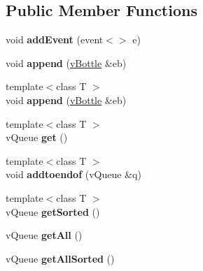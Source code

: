 \subsection*{Public Member Functions}
\begin{DoxyCompactItemize}
\item 
void {\bfseries add\+Event} (event$<$$>$ e)\hypertarget{classev_1_1vBottle_a5b17f0b46d9260ab255f38382b4b7268}{}\label{classev_1_1vBottle_a5b17f0b46d9260ab255f38382b4b7268}

\item 
void {\bfseries append} (\hyperlink{classev_1_1vBottle}{v\+Bottle} \&eb)\hypertarget{classev_1_1vBottle_a0c78e6f9ef839038d71486f6a8a6294a}{}\label{classev_1_1vBottle_a0c78e6f9ef839038d71486f6a8a6294a}

\item 
{\footnotesize template$<$class T $>$ }\\void {\bfseries append} (\hyperlink{classev_1_1vBottle}{v\+Bottle} \&eb)\hypertarget{classev_1_1vBottle_a9ef66f613e1bbf196c515e7d8b0416df}{}\label{classev_1_1vBottle_a9ef66f613e1bbf196c515e7d8b0416df}

\item 
{\footnotesize template$<$class T $>$ }\\v\+Queue {\bfseries get} ()\hypertarget{classev_1_1vBottle_a86302277c279a1b02d92f8e12afe6a2c}{}\label{classev_1_1vBottle_a86302277c279a1b02d92f8e12afe6a2c}

\item 
{\footnotesize template$<$class T $>$ }\\void {\bfseries addtoendof} (v\+Queue \&q)\hypertarget{classev_1_1vBottle_a65bf90aec03b80dee45bf834efe3fbfc}{}\label{classev_1_1vBottle_a65bf90aec03b80dee45bf834efe3fbfc}

\item 
{\footnotesize template$<$class T $>$ }\\v\+Queue {\bfseries get\+Sorted} ()\hypertarget{classev_1_1vBottle_a27569b9aaa7eb1ff9135d435b841c2de}{}\label{classev_1_1vBottle_a27569b9aaa7eb1ff9135d435b841c2de}

\item 
v\+Queue {\bfseries get\+All} ()\hypertarget{classev_1_1vBottle_af2abadf41f73c455dd451e34e9ba3376}{}\label{classev_1_1vBottle_af2abadf41f73c455dd451e34e9ba3376}

\item 
v\+Queue {\bfseries get\+All\+Sorted} ()\hypertarget{classev_1_1vBottle_a273cfda65fed58bcf19cedf6652948d9}{}\label{classev_1_1vBottle_a273cfda65fed58bcf19cedf6652948d9}

\end{DoxyCompactItemize}



